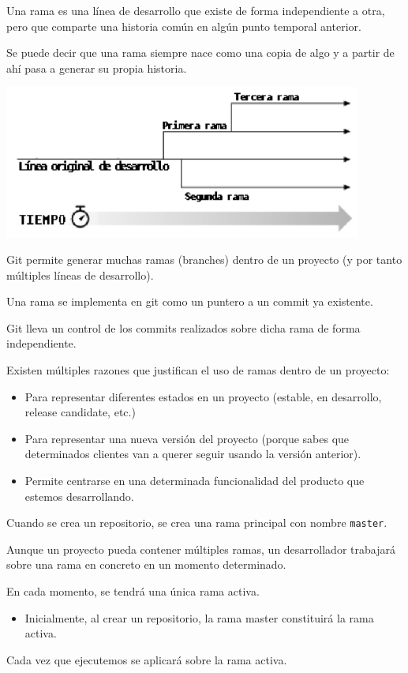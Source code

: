 Una rama es una línea de desarrollo que existe de forma independiente a otra, pero que comparte una historia común en algún punto temporal anterior.

Se puede decir que una rama siempre nace como una copia de algo y a partir de ahí pasa a generar su propia historia.
\begin{center}
	\includegraphics{"Temas/Tema 1/screenshot010"}
\end{center}
Git permite generar muchas ramas (branches) dentro de un proyecto (y por tanto múltiples líneas de desarrollo).

Una rama se implementa en git como un puntero a un commit ya existente.

Git lleva un control de los commits realizados sobre dicha rama de forma independiente.

Existen múltiples razones que justifican el uso de ramas dentro de un proyecto:
\begin{itemize}
	\item Para representar diferentes estados en un proyecto (estable, en desarrollo, release candidate, etc.)
\item Para representar una nueva versión del proyecto (porque sabes que determinados clientes van a querer seguir usando la versión anterior).
\item Permite centrarse en una determinada funcionalidad del producto que estemos desarrollando.
\end{itemize}
Cuando se crea un repositorio, se crea una rama principal con nombre \texttt{master}.

Aunque un proyecto pueda contener múltiples ramas, un desarrollador trabajará sobre una rama en concreto en un momento determinado.

En cada momento, se tendrá una única rama activa.

\begin{itemize}
	\item Inicialmente, al crear un repositorio, la rama master constituirá la rama activa.
\end{itemize}
Cada vez que ejecutemos  se aplicará sobre la rama activa.


